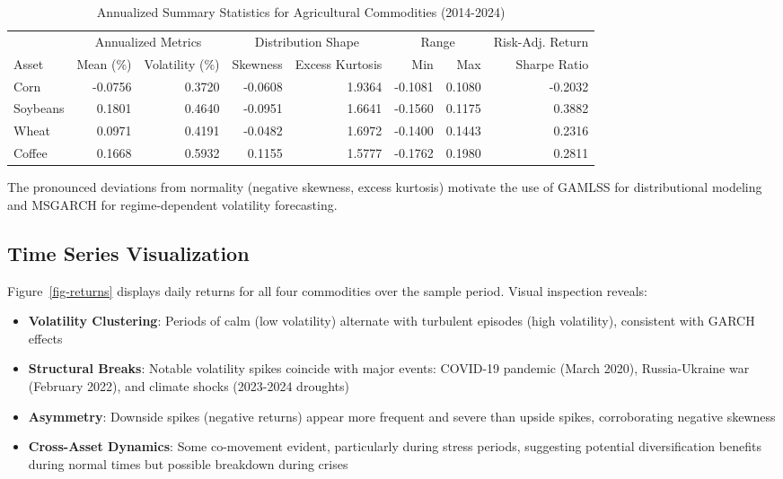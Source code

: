 \documentclass[
  10pt,
  a4paper,
]{article}
\providecommand{\tightlist}{%
  \setlength{\itemsep}{0pt}\setlength{\parskip}{0pt}}
\begin{document}
\begin{longtable}[t]{lrrrrrrr}

\caption{\label{tbl-descriptive}Annualized Summary Statistics for
Agricultural Commodities (2014-2024)}

\tabularnewline

\toprule
\multicolumn{1}{c}{ } & \multicolumn{2}{c}{Annualized Metrics} & \multicolumn{2}{c}{Distribution Shape} & \multicolumn{2}{c}{Range} & \multicolumn{1}{c}{Risk-Adj. Return} \\
\cmidrule(l{3pt}r{3pt}){2-3} \cmidrule(l{3pt}r{3pt}){4-5} \cmidrule(l{3pt}r{3pt}){6-7} \cmidrule(l{3pt}r{3pt}){8-8}
Asset & Mean (\%) & Volatility (\%) & Skewness & Excess Kurtosis & Min & Max & Sharpe Ratio\\
\midrule
Corn & -0.0756 & 0.3720 & -0.0608 & 1.9364 & -0.1081 & 0.1080 & -0.2032\\
Soybeans & 0.1801 & 0.4640 & -0.0951 & 1.6641 & -0.1560 & 0.1175 & 0.3882\\
Wheat & 0.0971 & 0.4191 & -0.0482 & 1.6972 & -0.1400 & 0.1443 & 0.2316\\
Coffee & 0.1668 & 0.5932 & 0.1155 & 1.5777 & -0.1762 & 0.1980 & 0.2811\\
\bottomrule

\end{longtable}

The pronounced deviations from normality (negative skewness, excess
kurtosis) motivate the use of GAMLSS for distributional modeling and
MSGARCH for regime-dependent volatility forecasting.

\subsection{Time Series Visualization}\label{sec-visualization}

Figure~\ref{fig-returns} displays daily returns for all four commodities
over the sample period. Visual inspection reveals:

\begin{itemize}
\tightlist
\item
  \textbf{Volatility Clustering}: Periods of calm (low volatility)
  alternate with turbulent episodes (high volatility), consistent with
  GARCH effects
\item
  \textbf{Structural Breaks}: Notable volatility spikes coincide with
  major events: COVID-19 pandemic (March 2020), Russia-Ukraine war
  (February 2022), and climate shocks (2023-2024 droughts)
\item
  \textbf{Asymmetry}: Downside spikes (negative returns) appear more
  frequent and severe than upside spikes, corroborating negative
  skewness
\item
  \textbf{Cross-Asset Dynamics}: Some co-movement evident, particularly
  during stress periods, suggesting potential diversification benefits
  during normal times but possible breakdown during crises
\end{itemize}
\end{document}
